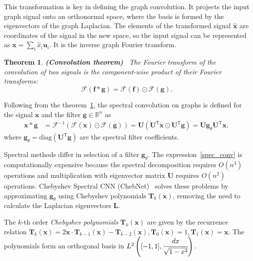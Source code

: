 \documentclass[12pt,twosides]{extarticle}
\newtheorem{Th}{Theorem}
\begin{document}
This transformation is key in defining the graph convolution. It projects the input graph signal onto an orthonormal space, where the basis is formed by the eigenvectors of the graph Laplacian. The elements of the transformed signal  $ \hat{\mathbf{x}}$ are coordinates of the signal in the new space, so the input signal can be represented as $\mathbf{x}=\sum_{i} \hat{x}_{i} \mathbf{u}_{i}$. It is the inverse graph Fourier transform.

\begin{Th}
	\textbf{(Convolution theorem)}~\cite{10.5555/1525499} The Fourier transform of the convolution of two signals is the component-wise product of their Fourier transforms: $$\mathscr{F}\left( \mathbf{f} * \mathbf{g}\right) =\mathscr{F}(\mathbf{f}) \odot \mathscr{F}(\mathbf{g}).$$
	\label{conv_theorem}
\end{Th}

Following from the theorem~\ref{conv_theorem}, the spectral convolution on graphs is defined for the signal $\mathbf{x}$ and the filter $\mathbf{g} \in \mathbb{R}^{n}$ as
\begin{align}
\mathbf{x} * \mathbf{g} &=\mathscr{F}^{-1}(\mathscr{F}(\mathbf{x}) \odot \mathscr{F}(\mathbf{g})) =\mathbf{U}\left(\mathbf{U}^{\mathsf{T}} \mathbf{x} \odot \mathbf{U}^{\mathsf{T}} \mathbf{g}\right) = \mathbf{U g}_{\theta} \mathbf{U}^{\mathsf{T}} \mathbf{x},\label{spec_conv}
\end{align}
where $\mathbf{g}_{\theta} = \text{diag}\left(\mathbf{U}^{\mathsf{T}} \mathbf{g}\right)$ are the spectral filter coefficients.

Spectral methods differ in selection of a filter $\mathbf{g}_{\theta}$. The expression~\eqref{spec_conv} is computationally expensive because the spectral decomposition requires $O\left(n^{3}\right)$ operations and multiplication with eigenvector matrix $\mathbf{U}$  requires $O\left(n^{2}\right)$  operations. Chebyshev Spectral CNN (ChebNet)~\cite{NIPS2016_6081} solves these problems by approximating $\mathbf{g}_{\theta}$ using Chebyshev polynomials $\mathbf{T}_k\mathbf{(x)}$, removing the need to calculate the Laplacian eigenvectors $\mathbf{L}$.

\begin{Def}
	The $k$-th order \textit{Chebyshev polynomials} $\mathbf{T}_k\mathbf{(x)}$ are given by the recurrence relation $ \mathbf{T}_{k}(\mathbf{x})=2 \mathbf{x} \cdot \mathbf{T}_{k-1}(\mathbf{x})-\mathbf{T}_{k-2}(\mathbf{x}), \mathbf{T}_{0}(\mathbf{x})=1, \mathbf{T}_{1}(\mathbf{x})=\mathbf{x}$. The polynomials form an orthogonal basis in $L^{2}\left([-1,1], \cfrac{d x} {\sqrt{1-x^{2}}}\right).$
\end{Def}
\end{document}
